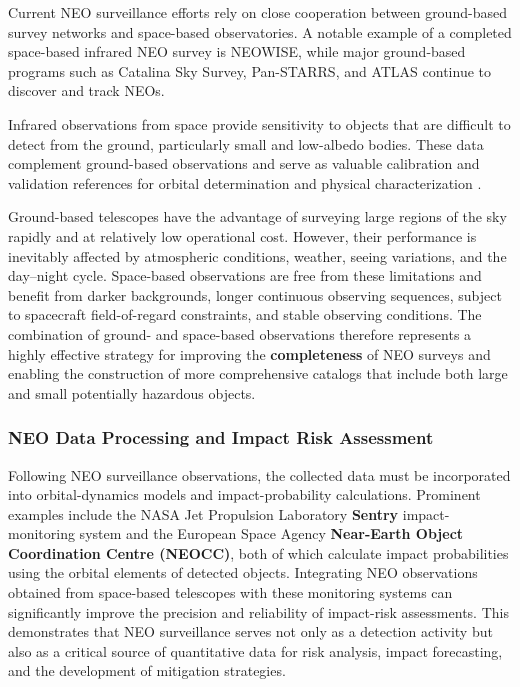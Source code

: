 Current NEO surveillance efforts rely on close cooperation between ground-based survey networks and space-based observatories. A notable example of a completed space-based infrared NEO survey is NEOWISE, while major ground-based programs such as Catalina Sky Survey, Pan-STARRS, and ATLAS continue to discover and track NEOs.

Infrared observations from space provide sensitivity to objects that are difficult to detect from the ground, particularly small and low-albedo bodies. These data complement ground-based observations and serve as valuable calibration and validation references for orbital determination and physical characterization \cite{mainzer2011}.

Ground-based telescopes have the advantage of surveying large regions of the sky rapidly and at relatively low operational cost. However, their performance is inevitably affected by atmospheric conditions, weather, seeing variations, and the day--night cycle. Space-based observations are free from these limitations and benefit from darker backgrounds, longer continuous observing sequences, subject to spacecraft field-of-regard constraints, and stable observing conditions. The combination of ground- and space-based observations therefore represents a highly effective strategy for improving the \textbf{completeness} of NEO surveys and enabling the construction of more comprehensive catalogs that include both large and small potentially hazardous objects.

\subsubsection{NEO Data Processing and Impact Risk Assessment}

Following NEO surveillance observations, the collected data must be incorporated into orbital-dynamics models and impact-probability calculations. Prominent examples include the NASA Jet Propulsion Laboratory \textbf{Sentry} impact-monitoring system and the European Space Agency \textbf{Near-Earth Object Coordination Centre (NEOCC)}, both of which calculate impact probabilities using the orbital elements of detected objects. Integrating NEO observations obtained from space-based telescopes with these monitoring systems can significantly improve the precision and reliability of impact-risk assessments. This demonstrates that NEO surveillance serves not only as a detection activity but also as a critical source of quantitative data for risk analysis, impact forecasting, and the development of mitigation strategies.

